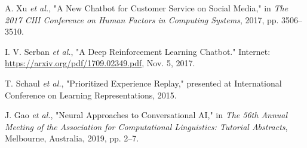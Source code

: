 \begin{thebibliography}{99}
A. Xu \textit{et al.}, "A New Chatbot for Customer Service on Social Media," in \textit{The 2017 CHI Conference on Human Factors in Computing Systems}, 2017, pp. 3506–3510.

I. V. Serban \textit{et al.}, "A Deep Reinforcement Learning Chatbot." Internet: \url{https://arxiv.org/pdf/1709.02349.pdf}, Nov. 5, 2017.

T. Schaul \textit{et al.}, "Prioritized Experience Replay," presented at International Conference on Learning Representations, 2015.

J. Gao \textit{et al.}, "Neural Approaches to Conversational AI," in \textit{The 56th Annual Meeting of the Association for Computational Linguistics: Tutorial Abstracts}, Melbourne, Australia, 2019, pp. 2–7.
\end{thebibliography}
